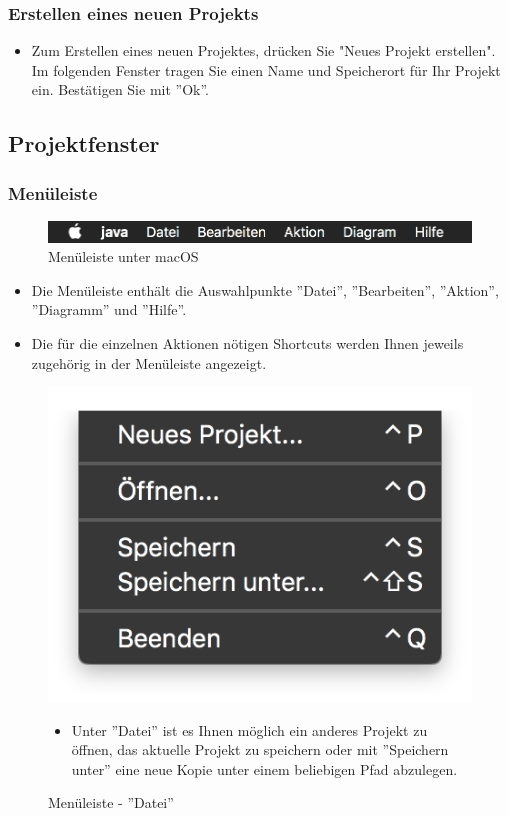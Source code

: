 \subsubsection{Erstellen eines neuen Projekts}
\begin{itemize}
\item Zum Erstellen eines neuen Projektes, drücken Sie "Neues Projekt erstellen". Im folgenden Fenster tragen Sie einen Name und Speicherort für Ihr Projekt ein. Bestätigen Sie mit ''Ok''.  
\end{itemize}

\subsection{Projektfenster}
\subsubsection{Menüleiste}
\begin{figure}[h!]
	\centering
	\includegraphics[width=1.0\textwidth]{Leiste.png}
	\caption{Menüleiste unter macOS}
\end{figure}
\begin{itemize}
\item Die Menüleiste enthält die Auswahlpunkte ''Datei'', ''Bearbeiten'', ''Aktion'', ''Diagramm'' und ''Hilfe''.
\item Die für die einzelnen Aktionen nötigen Shortcuts werden Ihnen jeweils zugehörig in der Menüleiste angezeigt. 
\end{itemize}

\begin{figure}[h!]
	\centering
	\includegraphics[width=.4\textwidth]{Leiste_Datei.png}
	\caption{Menüleiste - ''Datei''}
\begin{itemize}
\item Unter ''Datei'' ist es Ihnen möglich ein anderes Projekt zu öffnen, das aktuelle Projekt zu speichern oder mit ''Speichern unter'' eine neue Kopie unter einem beliebigen Pfad abzulegen.
\end{itemize}
\end{figure}


